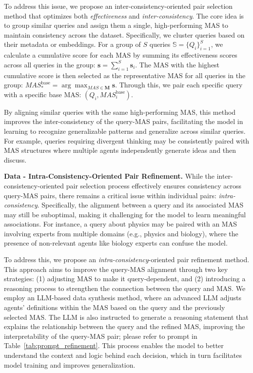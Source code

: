 \documentclass{article}
\theoremstyle{plain}
\theoremstyle{definition}
\theoremstyle{remark}
\begin{document}
To address this issue, we propose an inter-consistency-oriented pair selection method that optimizes both \textit{effectiveness} and \textit{inter-consistency}.
The core idea is to group similar queries and assign them a single, high-performing MAS to maintain consistency across the dataset.
Specifically, we cluster queries based on their metadata or embeddings.
For a group of $S$ queries $\mathbb{S} = \{Q_i\}_{i=1}^{S}$, we calculate a cumulative score for each MAS by summing its effectiveness scores across all queries in the group: $\mathbf{s} = \sum_{i=1}^S{\mathbf{s}_i}$.
The MAS with the highest cumulative score is then selected as the representative MAS for all queries in the group: $MAS^{\text{base}}_*=\arg \max_{MAS \in \mathbf{M}}{\mathbf{s}}$.
Through this, we pair each specific query with a specific base MAS: $(Q_i, MAS^{\text{base}}_i)$.

By aligning similar queries with the same high-performing MAS, this method improves the inter-consistency of the query-MAS pairs, facilitating the model in learning to recognize generalizable patterns and generalize across similar queries.
For example, queries requiring divergent thinking may be consistently paired with MAS structures where multiple agents independently generate ideas and then discuss.

\textbf{Data - Intra-Consistency-Oriented Pair Refinement.}
While the inter-consistency-oriented pair selection process effectively ensures consistency across query-MAS pairs, there remains a critical issue within individual pairs: \textit{intra-consistency}. 
Specifically, the alignment between a query and its associated MAS may still be suboptimal, making it challenging for the model to learn meaningful associations.
For instance, a query about physics may be paired with an MAS involving experts from multiple domains (e.g., physics and biology), where the presence of non-relevant agents like biology experts can confuse the model.

To address this, we propose an \textit{intra-consistency}-oriented pair refinement method.
This approach aims to improve the query-MAS alignment through two key strategies: (1) adjusting MAS to make it query-dependent,
and (2) introducing a reasoning process to strengthen the connection between the query and MAS.
We employ an LLM-based data synthesis method, where an advanced LLM adjusts agents' definitions within the MAS based on the query and the previously selected MAS.
The LLM is also instructed to generate a reasoning statement that explains the relationship between the query and the refined MAS, improving the interpretability of the query-MAS pair; please refer to prompt in Table~\ref{tab:prompt_refinement}.
This process enables the model to better understand the context and logic behind each decision, which in turn facilitates model training and improves generalization.
\end{document}
